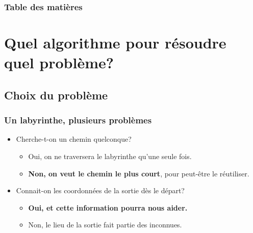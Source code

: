 \documentclass{beamer}
\begin{document}
\begin{frame}
  \frametitle{Table des matières}
  \tableofcontents
\end{frame} %

\section{Quel algorithme pour résoudre quel problème?}
\subsection{Choix du problème}
\begin{frame} 
  \frametitle{Un labyrinthe, plusieurs problèmes}
  \begin{itemize}
  \item<1-> Cherche-t-on un chemin quelconque?
    \begin{itemize}
    \item<2-> Oui, on ne traversera le labyrinthe qu'une seule fois.
    \item<2-> \textbf<3->{Non, on veut le chemin le plus court}, pour peut-être le réutiliser.
    \end{itemize}
  \item<4-> Connait-on les coordonnées de la sortie dès le départ?
    \begin{itemize}
    \item<5-> \textbf<6->{Oui, et cette information pourra nous aider.}
    \item<5-> Non, le lieu de la sortie fait partie des inconnues.
    \end{itemize}
  \end{itemize}
\end{frame} %
\end{document}
